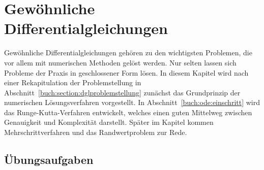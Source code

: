 %
%
%
\chapter{Gewöhnliche Differentialgleichungen\label{chapter:ode}}
\rhead{}
Gewöhnliche Differentialgleichungen gehören zu den wichtigsten
Problemen, die vor allem mit numerischen Methoden gelöst werden.
Nur selten lassen sich Probleme der Praxis in geschlossener
Form lösen.
In diesem Kapitel wird nach einer Rekapitulation der Problemstellung
in Abschnitt~\ref{buch:section:dglproblemstellung}
zunächst das Grundprinzip der numerischen Lösungsverfahren
vorgestellt.
In Abschnitt~\ref{buch:ode:einschritt} wird das Runge-Kutta-Verfahren
entwickelt, welches einen guten Mittelweg zwischen Genauigkeit und
Komplexität darstellt.
Später im Kapitel kommen Mehrschrittverfahren und das Randwertproblem
zur Rede.









\section*{Übungsaufgaben}
\begin{uebungsaufgaben}
\end{uebungsaufgaben}

